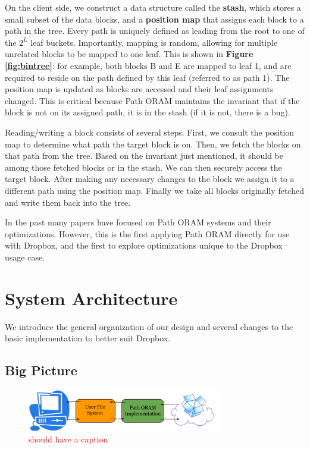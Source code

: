 \documentclass[conference]{IEEEtran}
\begin{document}
On the client side, we construct a data structure called the {\bf stash}, which stores a small subset of the data blocks, and a {\bf position map} that assigns each block to a path in the tree. Every path is uniquely defined as leading from the root to one of the $2^L$ leaf buckets. Importantly, mapping is random, allowing for multiple unrelated blocks to be mapped to one leaf. This is shown in {\bf Figure \ref{fig:bintree}}: for example, both blocks B and E are mapped to leaf 1, and are required to reside on the path defined by this leaf (referred to as path 1). The position map is updated as blocks are accessed and their leaf assignments changed. This is critical because Path ORAM maintains the invariant that if the block is not on its assigned path, it is in the stash (if it is not, there is a bug).

Reading/writing a block consists of several steps. First, we consult the position map to determine what path the target block is on. Then, we fetch the blocks on that path from the tree. Based on the invariant just mentioned, it should be among those fetched blocks or in the stash. We can then securely access the target block. After making any necessary changes to the block we assign it to a different path using the position map. Finally we take all blocks originally fetched and write them back into the tree.

In the past many papers have focused on Path ORAM systems and their optimizations. However, this is the first applying Path ORAM directly for use with Dropbox, and the first to explore optimizations unique to the Dropbox usage case.



\section{System Architecture}

We introduce the general organization of our design and several changes to the basic implementation to better suit Dropbox.

\subsection{Big Picture}

\begin{figure}
\begin{center}
  \noindent\includegraphics[width=8.5cm]{310.png}
  \caption{\textcolor{red}{should have a caption}}
  \label{fig:bigpic}
\end{center}
\end{figure}
\end{document}
